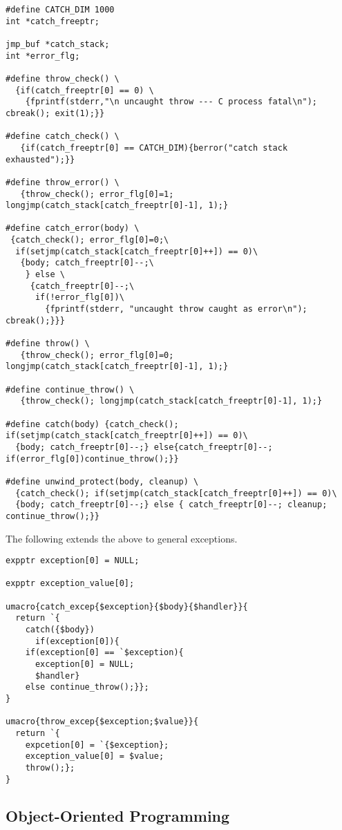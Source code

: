 \documentclass{article}
\begin{document}
\begin{verbatim}
#define CATCH_DIM 1000
int *catch_freeptr;

jmp_buf *catch_stack;
int *error_flg;

#define throw_check() \
  {if(catch_freeptr[0] == 0) \
    {fprintf(stderr,"\n uncaught throw --- C process fatal\n"); cbreak(); exit(1);}}

#define catch_check() \
   {if(catch_freeptr[0] == CATCH_DIM){berror("catch stack exhausted");}}

#define throw_error() \
   {throw_check(); error_flg[0]=1; longjmp(catch_stack[catch_freeptr[0]-1], 1);}

#define catch_error(body) \
 {catch_check(); error_flg[0]=0;\
  if(setjmp(catch_stack[catch_freeptr[0]++]) == 0)\
   {body; catch_freeptr[0]--;\
    } else \
     {catch_freeptr[0]--;\
      if(!error_flg[0])\
        {fprintf(stderr, "uncaught throw caught as error\n"); cbreak();}}}

#define throw() \
   {throw_check(); error_flg[0]=0; longjmp(catch_stack[catch_freeptr[0]-1], 1);}
  
#define continue_throw() \
   {throw_check(); longjmp(catch_stack[catch_freeptr[0]-1], 1);}

#define catch(body) {catch_check(); if(setjmp(catch_stack[catch_freeptr[0]++]) == 0)\
  {body; catch_freeptr[0]--;} else{catch_freeptr[0]--; if(error_flg[0])continue_throw();}}

#define unwind_protect(body, cleanup) \
  {catch_check(); if(setjmp(catch_stack[catch_freeptr[0]++]) == 0)\
  {body; catch_freeptr[0]--;} else { catch_freeptr[0]--; cleanup; continue_throw();}}
\end{verbatim}

The following extends the above to general exceptions.

\begin{verbatim}
expptr exception[0] = NULL;

expptr exception_value[0];

umacro{catch_excep{$exception}{$body}{$handler}}{
  return `{
    catch({$body})
      if(exception[0]){
	if(exception[0] == `$exception){
	  exception[0] = NULL;
	  $handler}
	else continue_throw();}};
}

umacro{throw_excep{$exception;$value}}{
  return `{
    expcetion[0] = `{$exception};
    exception_value[0] = $value;
    throw();};
}
\end{verbatim}


\subsection{Object-Oriented Programming}
\end{document}
